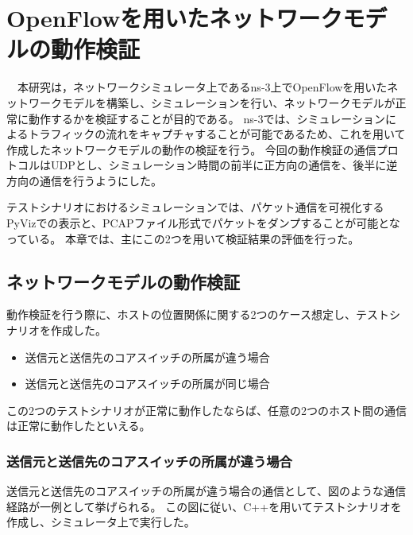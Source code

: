 \chapter{OpenFlowを用いたネットワークモデルの動作検証}

　本研究は，ネットワークシミュレータ上であるns-3上でOpenFlowを用いたネットワークモデルを構築し、シミュレーションを行い、ネットワークモデルが正常に動作するかを検証することが目的である。
ns-3では、シミュレーションによるトラフィックの流れをキャプチャすることが可能であるため、これを用いて作成したネットワークモデルの動作の検証を行う。
今回の動作検証の通信プロトコルはUDPとし、シミュレーション時間の前半に正方向の通信を、後半に逆方向の通信を行うようにした。

テストシナリオにおけるシミュレーションでは、パケット通信を可視化するPyVizでの表示と、PCAPファイル形式でパケットをダンプすることが可能となっている。
本章では、主にこの2つを用いて検証結果の評価を行った。

\section{ネットワークモデルの動作検証}

動作検証を行う際に、ホストの位置関係に関する2つのケース想定し、テストシナリオを作成した。

\begin{itemize}
	\item 送信元と送信先のコアスイッチの所属が違う場合
	\item 送信元と送信先のコアスイッチの所属が同じ場合
\end{itemize}

この2つのテストシナリオが正常に動作したならば、任意の2つのホスト間の通信は正常に動作したといえる。

\subsection{送信元と送信先のコアスイッチの所属が違う場合}

送信元と送信先のコアスイッチの所属が違う場合の通信として、図のような通信経路が一例として挙げられる。
この図に従い、C++を用いてテストシナリオを作成し、シミュレータ上で実行した。



